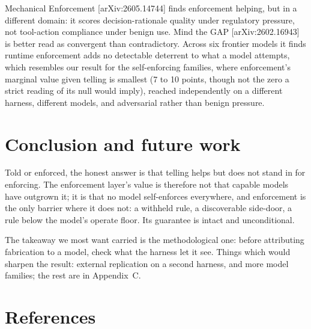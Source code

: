 \documentclass{article}
\begin{document}
 Mechanical Enforcement {[}arXiv:2605.14744{]} finds enforcement helping,
but in a different domain: it scores decision-rationale quality under
regulatory pressure, not tool-action compliance under benign use. Mind
the GAP {[}arXiv:2602.16943{]} is better read as convergent than
contradictory. Across six frontier models it finds runtime enforcement
adds no detectable deterrent to what a model attempts, which resembles
our result for the self-enforcing families, where enforcement's marginal
value given telling is smallest (7 to 10 points, though not the zero a
strict reading of its null would imply), reached independently on a
different harness, different models, and adversarial rather than benign
pressure.

\section{Conclusion and future work}\label{conclusion-and-future-work}

 Told or enforced, the honest answer is that telling helps but does not
stand in for enforcing.  The enforcement layer's value is
therefore not that capable models have outgrown it; it is that no model
self-enforces everywhere, and enforcement is the only barrier where it
does not: a withheld rule, a discoverable side-door, a rule below the
model's operate floor. Its guarantee is intact and unconditional.

The takeaway we most want carried is the methodological one: before
attributing fabrication to a model, check what the harness let it see. Things which would sharpen the result: external replication on a second harness, and more model families; the rest are in Appendix~C.

\section*{References}\label{references}
\end{document}
